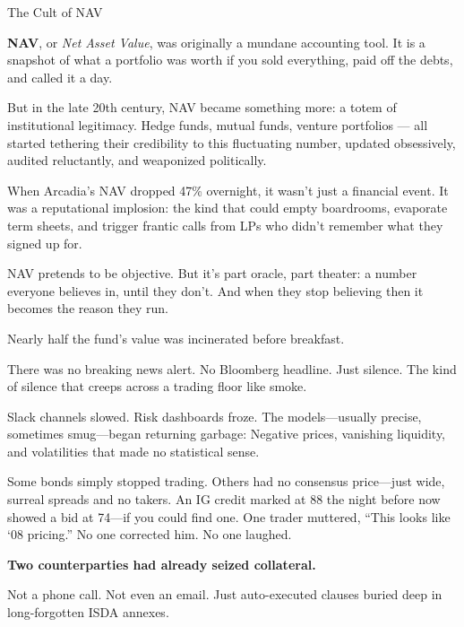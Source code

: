 \medskip

\begin{HistoricalSidebar}{The Cult of NAV}

  \textbf{NAV}, or \textit{Net Asset Value}, was originally a mundane accounting tool. It is a snapshot 
  of what a portfolio was worth if you sold everything, paid off the debts, and called it a day.

  \medskip
  
  But in the late 20th century, NAV became something more: a totem of institutional legitimacy. Hedge funds, 
  mutual funds, venture portfolios — all started tethering their credibility to this fluctuating number, 
  updated obsessively, audited reluctantly, and weaponized politically.

  \medskip
  
  When Arcadia’s NAV dropped 47\% overnight, it wasn’t just a financial event. It was a reputational implosion: 
  the kind that could empty boardrooms, evaporate term sheets, and trigger frantic calls from LPs who didn’t 
  remember what they signed up for.

  \medskip
  
  NAV pretends to be objective. But it’s part oracle, part theater: a number everyone believes in, until they 
  don’t. And when they stop believing then it becomes the reason they run.
  
\end{HistoricalSidebar}

\medskip

Nearly half the fund’s value was incinerated before breakfast.

There was no breaking news alert. No Bloomberg headline. Just silence.
The kind of silence that creeps across a trading floor like smoke.

Slack channels slowed.
Risk dashboards froze.
The models—usually precise, sometimes smug—began returning garbage:
Negative prices, vanishing liquidity, and volatilities that made no statistical sense.

Some bonds simply stopped trading.
Others had no consensus price—just wide, surreal spreads and no takers.
An IG credit marked at 88 the night before now showed a bid at 74—if you could find one.
One trader muttered, “This looks like ‘08 pricing.”
No one corrected him. No one laughed.

\textbf{Two counterparties had already seized collateral.}

Not a phone call. Not even an email.
Just auto-executed clauses buried deep in long-forgotten ISDA annexes.

